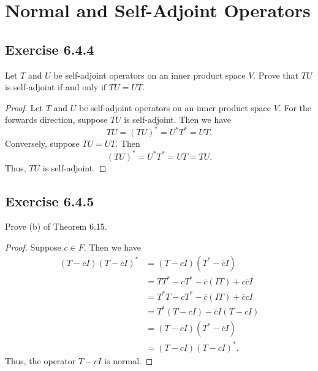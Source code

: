 \section{Normal and Self-Adjoint Operators}

\subsection*{Exercise 6.4.4} Let \( T  \) and \( U  \) be self-adjoint operators on an inner product space \( V  \). Prove that \( TU  \) is self-adjoint if and only if \( TU = UT  \).
\begin{proof}
Let \( T  \) and \( U  \) be self-adjoint operators on an inner product space \( V  \). For the forwards direction, suppose \( TU  \) is self-adjoint. Then we have
\[  TU = (TU)^{*} = U^{*} T^{*} = UT. \]
Conversely, suppose \( TU = UT \). Then
\[  (TU)^{*} = U^{*}T^{*} = UT = TU.  \]
Thus, \( TU  \) is self-adjoint.
\end{proof}

\subsection*{Exercise 6.4.5} Prove (b) of Theorem 6.15.

\begin{proof}
Suppose \( c \in F  \). Then we have
        \begin{align*}
            (T - cI)(T - cI)^{*} &= (T - cI)(T^{*} - \overline{c}I) \\
                                 &= TT^{*} - c T^{*} - \overline{c} (IT) + c \overline{c} I\\
                                 &= T^{*}T - c T^{*} - \overline{c} (IT) + \overline{c} c   I \\
                                 &= T^{*} (T - cI) - \overline{c} I  (T - cI) \\
                                 &= (T - cI) (T^{*} - \overline{c}I) \\
                                 &= (T - cI) (T  - cI)^{*}.
        \end{align*}
        Thus, the operator \( T - cI \) is normal.
    \end{proof}

